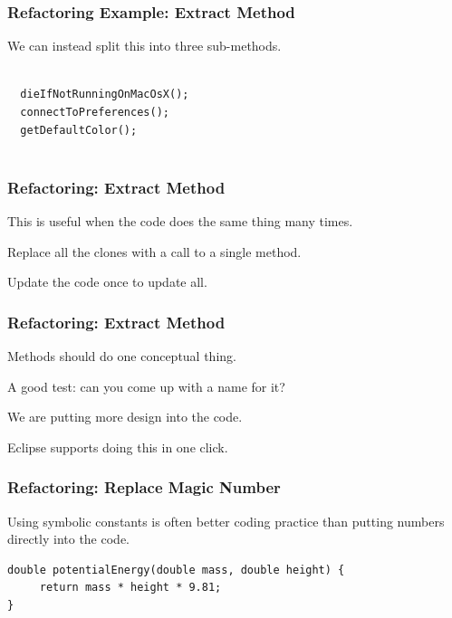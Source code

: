 \begin{frame}[fragile]
\frametitle{Refactoring Example: Extract Method}
\begin{changemargin}{1cm}

We can instead split this into three sub-methods.

\begin{verbatim}

  dieIfNotRunningOnMacOsX();
  connectToPreferences();
  getDefaultColor();


\end{verbatim}
\end{changemargin}
\end{frame}

\begin{frame}
\frametitle{Refactoring: Extract Method}
\begin{changemargin}{1cm}

This is useful when the code does the same thing many times.

Replace all the clones with a call to a single method.

Update the code once to update all.

\end{changemargin}
\end{frame}

\begin{frame}
\frametitle{Refactoring: Extract Method}
\begin{changemargin}{1cm}

Methods should do one conceptual thing.

A good test: can you come up with a name for it?

We are putting more design into the code.

Eclipse supports doing this in one click.

\end{changemargin}
\end{frame}

\begin{frame}[fragile]
\frametitle{Refactoring: Replace Magic Number}
\begin{changemargin}{1cm}
 Using symbolic constants is often better coding practice
than putting numbers directly into the code.

\begin{verbatim}
double potentialEnergy(double mass, double height) {
     return mass * height * 9.81;
}
\end{verbatim}

\end{changemargin}
\end{frame}

